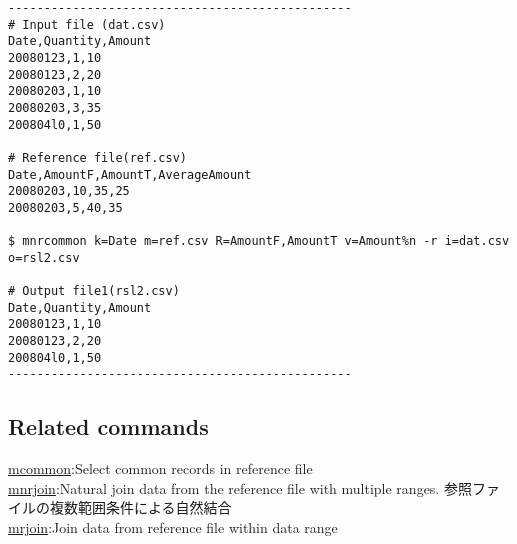 \documentclass[a4paper]{jarticle}
\begin{document}
\begin{verbatim}
------------------------------------------------
# Input file (dat.csv)
Date,Quantity,Amount
20080123,1,10
20080123,2,20
20080203,1,10
20080203,3,35
200804l0,1,50

# Reference file(ref.csv)
Date,AmountF,AmountT,AverageAmount
20080203,10,35,25
20080203,5,40,35

$ mnrcommon k=Date m=ref.csv R=AmountF,AmountT v=Amount%n -r i=dat.csv o=rsl2.csv

# Output file1(rsl2.csv)
Date,Quantity,Amount
20080123,1,10
20080123,2,20
200804l0,1,50
------------------------------------------------
\end{verbatim}

\subsection*{Related commands}
\noindent
\href{run:mcommon.pdf}{mcommon}:Select common records in reference file\\
\href{run:mnrjoin.pdf}{mnrjoin}:Natural join data from the reference file with multiple ranges. 参照ファイルの複数範囲条件による自然結合\\
\href{run:mrjoin.pdf}{mrjoin}:Join data from reference file within data range \\
\end{document}
